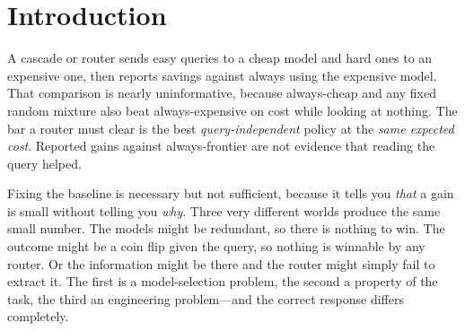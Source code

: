 \documentclass[10pt]{article}
\begin{document}
\section{Introduction}

A cascade or router sends easy queries to a cheap model and hard ones to an
expensive one, then reports savings against always using the expensive model.
That comparison is nearly uninformative, because always-cheap and any fixed
random mixture also beat always-expensive on cost while looking at nothing. The
bar a router must clear is the best \emph{query-independent} policy at the
\emph{same expected cost}. Reported gains against always-frontier are not
evidence that reading the query helped.

Fixing the baseline is necessary but not sufficient, because it tells you
\emph{that} a gain is small without telling you \emph{why}. Three very different
worlds produce the same small number. The models might be redundant, so there is
nothing to win. The outcome might be a coin flip given the query, so nothing is
winnable by any router. Or the information might be there and the router might
simply fail to extract it. The first is a model-selection problem, the second a
property of the task, the third an engineering problem---and the correct response
differs completely.
\end{document}

